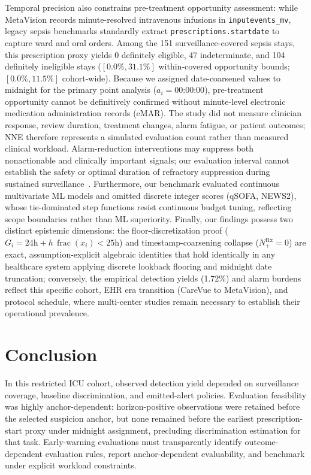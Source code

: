 \documentclass[10pt,twocolumn,a4paper]{article}
\begin{document}
Temporal precision also constrains pre-treatment opportunity assessment: while MetaVision records minute-resolved intravenous infusions in \texttt{inputevents\_mv}, legacy sepsis benchmarks standardly extract \texttt{prescriptions.startdate} to capture ward and oral orders. Among the 151 surveillance-covered sepsis stays, this prescription proxy yields 0 definitely eligible, 47 indeterminate, and 104 definitely ineligible stays ($[0.0\%, 31.1\%]$ within-covered opportunity bounds; $[0.0\%, 11.5\%]$ cohort-wide). Because we assigned date-coarsened values to midnight for the primary point analysis ($a_i = \text{00:00:00}$), pre-treatment opportunity cannot be definitively confirmed without minute-level electronic medication administration records (eMAR). The study did not measure clinician response, review duration, treatment changes, alarm fatigue, or patient outcomes; NNE therefore represents a simulated evaluation count rather than measured clinical workload. Alarm-reduction interventions may suppress both nonactionable and clinically important signals; our evaluation interval cannot establish the safety or optimal duration of refractory suppression during sustained surveillance~\cite{paine2016systematic}. Furthermore, our benchmark evaluated continuous multivariate ML models and omitted discrete integer scores (qSOFA, NEWS2), whose tie-dominated step functions resist continuous budget tuning, reflecting scope boundaries rather than ML superiority. Finally, our findings possess two distinct epistemic dimensions: the floor-discretization proof ($G_i = 24\mathrm{h} + h\,\operatorname{frac}(x_i) < 25\mathrm{h}$) and timestamp-coarsening collapse ($N_+^{\mathrm{Rx}} = 0$) are exact, assumption-explicit algebraic identities that hold identically in any healthcare system applying discrete lookback flooring and midnight date truncation; conversely, the empirical detection yields (1.72\%) and alarm burdens reflect this specific cohort, EHR era transition (CareVue to MetaVision), and protocol schedule, where multi-center studies remain necessary to establish their operational prevalence.

\section{Conclusion}
In this restricted ICU cohort, observed detection yield depended on surveillance coverage, baseline discrimination, and emitted-alert policies. Evaluation feasibility was highly anchor-dependent: horizon-positive observations were retained before the selected suspicion anchor, but none remained before the earliest prescription-start proxy under midnight assignment, precluding discrimination estimation for that task. Early-warning evaluations must transparently identify outcome-dependent evaluation rules, report anchor-dependent evaluability, and benchmark under explicit workload constraints.
\end{document}
